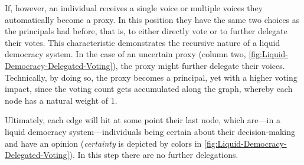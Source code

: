If, however, an individual receives a single voice or multiple voices they automatically become a proxy. In this position they have the same two choices as the principals had before, that is, to either directly vote or to further delegate their votes. This characteristic demonstrates the recursive nature of a liquid democracy system. In the case of an uncertain proxy (column two, \autoref{fig:Liquid-Democracy-Delegated-Voting}), the proxy might further delegate their voices. Technically, by doing so, the proxy becomes a principal, yet with a higher voting impact, since the voting count gets accumulated along the graph, whereby each node has a natural weight of \(1\).

Ultimately, each edge will hit at some point their last node, which are---in a liquid democracy system---individuals being certain about their decision-making and have an opinion (\textit{certainty} is depicted by colors in \autoref{fig:Liquid-Democracy-Delegated-Voting}). In this step there are no further delegations.

